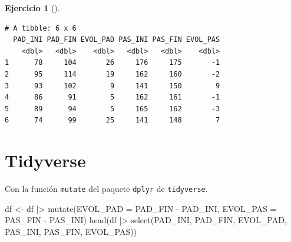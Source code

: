 \documentclass[
  a4paper,
]{scrreport}
\newenvironment{Shaded}{\begin{snugshade}}{\end{snugshade}}
\newcommand{\AttributeTok}[1]{\textcolor[rgb]{0.40,0.45,0.13}{#1}}
\newcommand{\FunctionTok}[1]{\textcolor[rgb]{0.28,0.35,0.67}{#1}}
\newcommand{\NormalTok}[1]{\textcolor[rgb]{0.00,0.23,0.31}{#1}}
\newcommand{\OtherTok}[1]{\textcolor[rgb]{0.00,0.23,0.31}{#1}}
\newcommand{\SpecialCharTok}[1]{\textcolor[rgb]{0.37,0.37,0.37}{#1}}
\newcommand{\StringTok}[1]{\textcolor[rgb]{0.13,0.47,0.30}{#1}}
\theoremstyle{definition}
\newtheorem{exercise}{Ejercicio}[chapter]
\theoremstyle{remark}
\begin{document}
\begin{exercise}[]
\begin{enumerate}
\begin{tcolorbox}
\begin{Shaded}
\end{Shaded}

\begin{verbatim}
# A tibble: 6 x 6
  PAD_INI PAD_FIN EVOL_PAD PAS_INI PAS_FIN EVOL_PAS
    <dbl>   <dbl>    <dbl>   <dbl>   <dbl>    <dbl>
1      78     104       26     176     175       -1
2      95     114       19     162     160       -2
3      93     102        9     141     150        9
4      86      91        5     162     161       -1
5      89      94        5     165     162       -3
6      74      99       25     141     148        7
\end{verbatim}

  \section{Tidyverse}

  Con la función \texttt{mutate} del paquete \texttt{dplyr} de
  \texttt{tidyverse}.

\begin{Shaded}
\begin{Highlighting}[]
\NormalTok{df }\OtherTok{\textless{}{-}}\NormalTok{ df }\SpecialCharTok{|\textgreater{}} \FunctionTok{mutate}\NormalTok{(}\AttributeTok{EVOL\_PAD =}\NormalTok{ PAD\_FIN }\SpecialCharTok{{-}}\NormalTok{ PAD\_INI, }\AttributeTok{EVOL\_PAS =}\NormalTok{ PAS\_FIN }\SpecialCharTok{{-}}\NormalTok{ PAS\_INI)}
\FunctionTok{head}\NormalTok{(df }\SpecialCharTok{|\textgreater{}} \FunctionTok{select}\NormalTok{(PAD\_INI, PAD\_FIN, EVOL\_PAD, PAS\_INI, PAS\_FIN, EVOL\_PAS))}
\end{Highlighting}
\end{Shaded}


\end{tcolorbox}
\end{enumerate}
\end{exercise}
\end{document}
